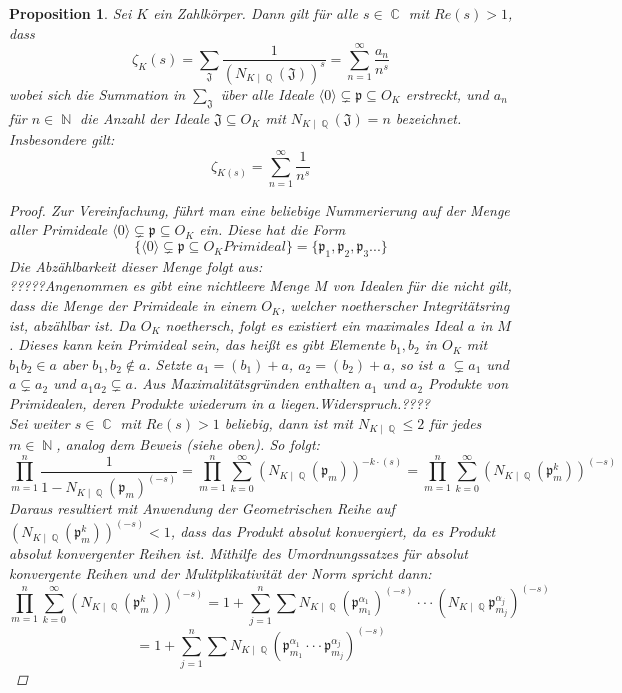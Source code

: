 \documentclass[10pt,a4paper]{article}
\theoremstyle{plain}
\newtheorem{prop}[thm]{Proposition}
\theoremstyle{definition}
\theoremstyle{remark}
\DeclareMathOperator{\C}{\mathbb{C}}
\DeclareMathOperator{\Q}{\mathbb{Q}}
\DeclareMathOperator{\N}{\mathbb{N}}
\begin{document}
\begin{prop}

\textit{Sei $\textit{K}$ ein Zahlkörper. Dann gilt für alle $s \in \C$ mit $Re(s)>1$, dass$$\zeta_{K}(s) = \sum_{\mathfrak{J}}\frac{1}{(N_{K\mid\Q}(\mathfrak{J}))^s}=\sum_{n=1}^{\infty}\frac{a_n}{n^s}$$
wobei sich die Summation in $\sum_{\mathfrak{J}}$ über alle Ideale $\langle0\rangle\subsetneq \mathfrak{p} \subseteq O_{\textit{K}}$ erstreckt, und $a_n$ für $n \in \N$ die Anzahl der Ideale $\mathfrak{J} \subseteq O_K$ mit $N_{K\mid \Q}(\mathfrak{J}) = n$ bezeichnet. Insbesondere gilt: $$\zeta_{K(s)}= \sum_{n=1}^{\infty}\frac{1}{n^s}$$}

\begin{proof}

Zur Vereinfachung, führt man eine beliebige Nummerierung auf der Menge aller Primideale $\langle0\rangle\subsetneq \mathfrak{p} \subseteq O_{\textit{K}}$ ein. Diese hat die Form $$\{\langle0\rangle\subsetneq \mathfrak{p} \subseteq O_{\textit{K}} Primideal \}=\{\mathfrak{p}_1,\mathfrak{p}_2,\mathfrak{p}_3...\}$$Die Abzählbarkeit dieser Menge folgt aus: 
\\
?????Angenommen es gibt eine nichtleere Menge $M$ von Idealen für die nicht gilt, dass die Menge der Primideale in einem $O_K$, welcher noetherscher Integritätsring ist, abzählbar ist. Da $O_K$ noethersch, folgt es existiert ein maximales Ideal $a$ in $M$. Dieses kann kein Primideal sein, das heißt es gibt Elemente $b_1,b_2$ in $O_K$ mit $b_1b_2 \in a$ aber $b_1,b_2 \notin a$. Setzte $a_1=(b_1)+a$, $a_2=(b_2)+a$, so ist a $\subsetneq a_1$ und $a \subsetneq a_2$ und $a_1a_2 \subsetneq a$. Aus Maximalitätsgründen enthalten $a_1$ und $a_2$ Produkte von Primidealen, deren Produkte wiederum in $a$ liegen.Widerspruch.????
\\
Sei weiter $s \in \C$ mit $Re(s) > 1$ beliebig, dann ist mit $N_{K\mid \Q}\leq 2$ für jedes $m \in \N$, analog dem \textit{Beweis} (siehe oben). So folgt:$$\prod_{m=1}^{n}\frac{1}{1-N_{K\mid \Q}(\mathfrak{p}_m)^{(-s)}} =\prod_{m=1}^{n}\sum_{k=0}^{\infty}(N_{K\mid \Q}(\mathfrak{p}_m))^{-k\cdot(s)}=\prod_{m=1}^{n}\sum_{k=0}^{\infty}(N_{K\mid \Q}(\mathfrak{p}_m^k))^{(-s)}$$
Daraus resultiert mit Anwendung der Geometrischen Reihe auf \\
$(N_{K\mid \Q}(\mathfrak{p}_m^k))^{(-s)} < 1$, dass das Produkt absolut konvergiert, da es Produkt absolut konvergenter Reihen ist. Mithilfe des Umordnungssatzes für absolut konvergente Reihen und der Mulitplikativität der Norm spricht dann:
$$\prod_{m=1}^{n}\sum_{k=0}^{\infty}(N_{K\mid \Q}(\mathfrak{p}_m^k))^{(-s)}=1+\sum_{j=1}^{n}\sum N_{K\mid \Q}(\mathfrak{p}_{m_1}^{\alpha_1})^{(-s)}\cdot\cdot\cdot(N_{K\mid \Q}\mathfrak{p}_{m_j}^{\alpha_j})^{(-s)}$$ $$=1+\sum_{j=1}^{n}\sum N_{K\mid \Q}(\mathfrak{p}_{m_1}^{\alpha_1}\cdot\cdot\cdot\mathfrak{p}_{m_j}^{\alpha_j})^{(-s)}$$

\end{proof}
\end{prop}
\end{document}
